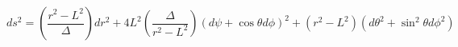\begin{equation}
ds^2=\left(\frac{r^{2} - L^{2}}{\Delta}\right)dr^{2}+4 L^{2}
\left(\frac{\Delta}{r^{2} - L^{2}}\right) (d\psi+\cos \theta
d\phi)^{2}+(r^{2}-L^{2})(d\theta^{2}+\sin^{2}\theta d\phi^{2})
\label{TB}
\end{equation} 
